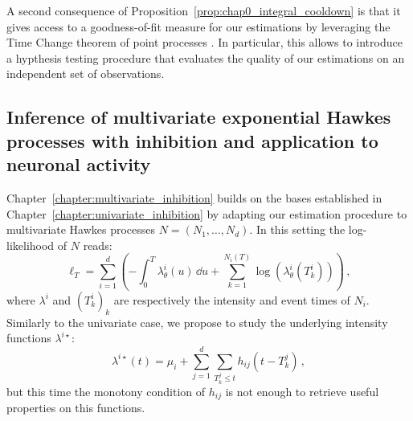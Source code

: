     A second consequence of Proposition~\ref{prop:chap0_integral_cooldown} is that it gives access to a goodness-of-fit measure for our estimations by leveraging the Time Change theorem of point processes \parencite[Theorem 7.4.IV]{DaleyV1}.
    In particular, this allows to introduce a hypthesis testing procedure that evaluates the quality of our estimations on an independent set of observations.
    






    \subsection{Inference of multivariate exponential Hawkes processes with inhibition and application to neuronal activity}
    Chapter~\ref{chapter:multivariate_inhibition} builds on the bases established in Chapter~\ref{chapter:univariate_inhibition} by adapting our estimation procedure to multivariate Hawkes processes $N = (N_1, \ldots, N_d)$. 
    In this setting the log-likelihood of $N$ reads:
    \[\ell_T = \sum_{i=1}^{d}{\left(- \int_{0}^{T}{\lambda_\theta^i(u)\,\dd u} + \sum_{k=1}^{N_i(T)}{\log(\lambda^i_\theta(T_k^i))} \right)}\,,\]
    where $\lambda^i$ and $(T_k^i)_k$ are respectively the intensity and event times of $N_i$.
    Similarly to the univariate case, we propose to study the underlying intensity functions $\lambda^{i\star}$:
    \[\lambda^{i\star}(t) = \mu_i + \sum_{j=1}^{d}\sum_{T_k^j \leq t}{h_{ij}(t-T_k^j)}\,,\]
    but this time the monotony condition of $h_{ij}$ is not enough to retrieve useful properties on this functions.

